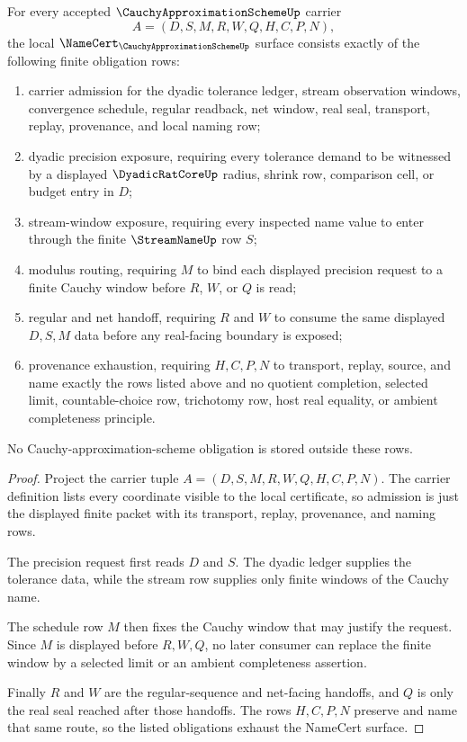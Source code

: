 \begin{theorem}
\label{thm:cauchy-approximation-scheme-namecert-obligations}
For every accepted $\CauchyApproximationSchemeUp$ carrier
$$
A=(D,S,M,R,W,Q,H,C,P,N),
$$
the local $\NameCert_{\CauchyApproximationSchemeUp}$ surface consists exactly of the following finite obligation rows:
\begin{enumerate}
\item carrier admission for the dyadic tolerance ledger, stream observation windows, convergence schedule, regular readback, net window, real seal, transport, replay, provenance, and local naming row;
\item dyadic precision exposure, requiring every tolerance demand to be witnessed by a displayed $\DyadicRatCoreUp$ radius, shrink row, comparison cell, or budget entry in $D$;
\item stream-window exposure, requiring every inspected name value to enter through the finite $\StreamNameUp$ row $S$;
\item modulus routing, requiring $M$ to bind each displayed precision request to a finite Cauchy window before $R$, $W$, or $Q$ is read;
\item regular and net handoff, requiring $R$ and $W$ to consume the same displayed $D,S,M$ data before any real-facing boundary is exposed;
\item provenance exhaustion, requiring $H,C,P,N$ to transport, replay, source, and name exactly the rows listed above and no quotient completion, selected limit, countable-choice row, trichotomy row, host real equality, or ambient completeness principle.
\end{enumerate}
No Cauchy-approximation-scheme obligation is stored outside these rows.
\end{theorem}

\begin{proof}
Project the carrier tuple $A=(D,S,M,R,W,Q,H,C,P,N)$. The carrier definition lists every coordinate visible to the local certificate, so admission is just the displayed finite packet with its transport, replay, provenance, and naming rows.

The precision request first reads $D$ and $S$. The dyadic ledger supplies the tolerance data, while the stream row supplies only finite windows of the Cauchy name.

The schedule row $M$ then fixes the Cauchy window that may justify the request. Since $M$ is displayed before $R,W,Q$, no later consumer can replace the finite window by a selected limit or an ambient completeness assertion.

Finally $R$ and $W$ are the regular-sequence and net-facing handoffs, and $Q$ is only the real seal reached after those handoffs. The rows $H,C,P,N$ preserve and name that same route, so the listed obligations exhaust the NameCert surface.
\end{proof}

